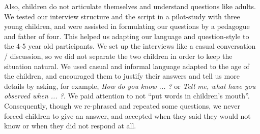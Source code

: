 \documentclass{sig-alternate}
\begin{document}
Also, children do not articulate themselves and understand questions like
adults. We tested our interview structure and the script in a pilot-study with
three young children, and were assisted in formulating our questions by a
pedagogue and father of four. This helped us adapting our language and
question-style to the 4-5 year old participants. We set up the interviews like a
casual conversation / discussion, so we did not separate the two children in
order to keep the situation natural. We used casual and informal language
adapted to the age of the children, and encouraged them to justify their answers
and tell us more details by asking, for example, \textit{How do you know ... ?}
or \textit{Tell me, what have you observed when ... ?}. We paid attention to not
``put words in children's mouth''. Consequently, though we re-phrased and
repeated some questions, we never forced children to give an answer, and
accepted when they said they would not know or when they did not respond at all.	
\end{document}
